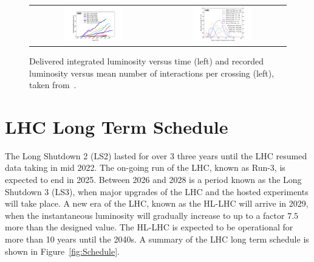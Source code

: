 \begin{figure}[tbh!]
 \begin{center}
 \begin{tabular}{cc}
 \includegraphics[width=0.48\textwidth]{figures/Part2/LHC/twikilumi}&
 \includegraphics[width=0.48\textwidth]{figures/Part2/LHC/twikipu}\\
 \end{tabular}
 \caption{Delivered integrated luminosity versus time (left) and recorded luminosity versus mean number of interactions per crossing (left), taken from~\cite{twiki:lumi}.}
 \label{fig:twikilumi}
 \end{center}
\end{figure} 

\section{LHC Long Term Schedule}
\label{sec:Plan}

The Long Shutdown 2 (LS2) lasted for over 3 three years until the \ac{LHC} resumed data taking in mid 2022. The on-going run of the \ac{LHC}, known as Run-3, is expected to end in 2025. Between 2026 and 2028 is a period known as the Long Shutdown 3 (LS3), when major upgrades of the \ac{LHC} and the hosted experiments will take place. A new era of the \ac{LHC}, known as the \ac{HL-LHC} will arrive in 2029, when the instantaneous luminosity will gradually increase to up to a factor $7.5$ more than the designed value. The \ac{HL-LHC} is expected to be operational for more than 10 years until the 2040s. A summary of the \ac{LHC} long term schedule is shown in Figure~\ref{fig:Schedule}.

